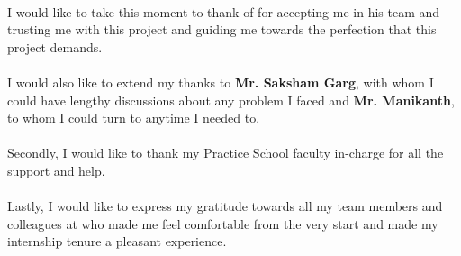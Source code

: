 

\paragraph{}
I would like to take this moment to thank \textbf{\printpsstationincharge} of
\printpsstation{} for accepting me in his team and trusting me with this
project and guiding me towards the perfection that this project demands.

\paragraph{}
I would also like to extend my thanks to \textbf{Mr. Saksham Garg}, with whom I
could have lengthy discussions about any problem I faced and
\textbf{Mr. Manikanth}, to whom I could turn to anytime I needed to.

\paragraph{}
Secondly, I would like to thank my Practice School faculty in-charge
\textbf{\printpsfaculty} for all the support and help.

\paragraph{}
Lastly, I would like to express my gratitude towards all my team members and
colleagues at \printpsstation{} who made me feel comfortable from the very start
and made my internship tenure a pleasant experience.
